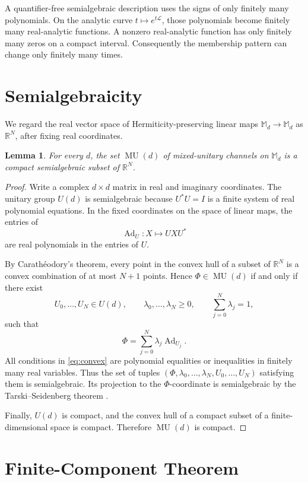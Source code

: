 \documentclass[11pt]{article}
\newtheorem{lemma}{Lemma}
\newcommand{\R}{\mathbb R}
\newcommand{\M}{\mathbb M}
\newcommand{\MU}{\operatorname{MU}}
\newcommand{\Ad}{\operatorname{Ad}}
\begin{document}
A quantifier-free semialgebraic description uses the signs of only finitely
many polynomials. On the analytic curve \(t\mapsto e^{t\mathcal L}\), those
polynomials become finitely many real-analytic functions. A nonzero
real-analytic function has only finitely many zeros on a compact interval.
Consequently the membership pattern can change only finitely many times.

\section*{Semialgebraicity}

We regard the real vector space of Hermiticity-preserving linear maps
\(\M_d\to\M_d\) as \(\R^N\), after fixing real coordinates.

\begin{lemma}\label{lem:semi}
For every \(d\), the set \(\MU(d)\) of mixed-unitary channels on \(\M_d\) is
a compact semialgebraic subset of \(\R^N\).
\end{lemma}

\begin{proof}
Write a complex \(d\times d\) matrix in real and imaginary coordinates.
The unitary group \(U(d)\) is semialgebraic because \(U^*U=I\) is a finite
system of real polynomial equations. In the fixed coordinates on the space of
linear maps, the entries of
\[
 \Ad_U:X\longmapsto UXU^*
\]
are real polynomials in the entries of \(U\).

By Carath\'eodory's theorem, every point in the convex hull of a subset of
\(\R^N\) is a convex combination of at most \(N+1\) points. Hence
\(\Phi\in\MU(d)\) if and only if there exist
\[
 U_0,\ldots,U_N\in U(d),\qquad
 \lambda_0,\ldots,\lambda_N\ge0,\qquad
 \sum_{j=0}^N\lambda_j=1,
\]
such that
\[
 \Phi=\sum_{j=0}^N\lambda_j\Ad_{U_j}.
 \tag{2}\label{eq:convex}
\]
All conditions in \eqref{eq:convex} are polynomial equalities or
inequalities in finitely many real variables. Thus the set of tuples
\((\Phi,\lambda_0,\ldots,\lambda_N,U_0,\ldots,U_N)\) satisfying them is
semialgebraic. Its projection to the \(\Phi\)-coordinate is semialgebraic by
the Tarski--Seidenberg theorem \cite[Chapter 2]{BPR}.

Finally, \(U(d)\) is compact, and the convex hull of a compact subset of a
finite-dimensional space is compact. Therefore \(\MU(d)\) is compact.
\end{proof}

\section*{Finite-Component Theorem}
\end{document}
